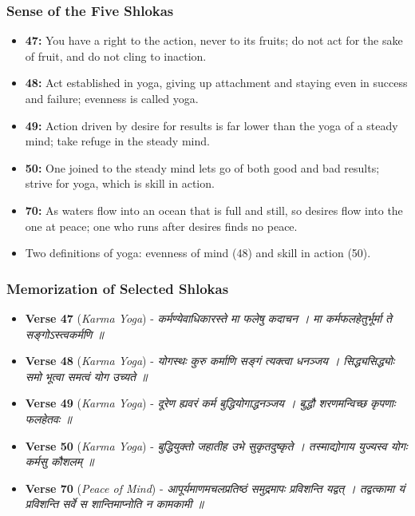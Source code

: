 \begin{frame}[fragile]\frametitle{Sense of the Five Shlokas}

      \begin{itemize}
		\item \textbf{47:} You have a right to the action, never to its fruits; do not act for the sake of fruit, and do not cling to inaction.
		\item \textbf{48:} Act established in yoga, giving up attachment and staying even in success and failure; evenness is called yoga.
		\item \textbf{49:} Action driven by desire for results is far lower than the yoga of a steady mind; take refuge in the steady mind.
		\item \textbf{50:} One joined to the steady mind lets go of both good and bad results; strive for yoga, which is skill in action.
		\item \textbf{70:} As waters flow into an ocean that is full and still, so desires flow into the one at peace; one who runs after desires finds no peace.
		\item Two definitions of yoga: evenness of mind (48) and skill in action (50).
	  \end{itemize}

\end{frame}

\begin{frame}[fragile]\frametitle{Memorization of Selected Shlokas}

      \begin{itemize}
		\item \textbf{Verse 47} (\textit{Karma Yoga}) - \textit{कर्मण्येवाधिकारस्ते मा फलेषु कदाचन । मा कर्मफलहेतुर्भूर्मा ते सङ्गोऽस्त्वकर्मणि ॥}
		\item \textbf{Verse 48} (\textit{Karma Yoga}) - \textit{योगस्थः कुरु कर्माणि सङ्गं त्यक्त्वा धनञ्जय । सिद्ध्यसिद्ध्योः समो भूत्वा समत्वं योग उच्यते ॥}
		\item \textbf{Verse 49} (\textit{Karma Yoga}) - \textit{दूरेण ह्यवरं कर्म बुद्धियोगाद्धनञ्जय । बुद्धौ शरणमन्विच्छ कृपणाः फलहेतवः ॥}
		\item \textbf{Verse 50} (\textit{Karma Yoga}) - \textit{बुद्धियुक्तो जहातीह उभे सुकृतदुष्कृते । तस्माद्योगाय युज्यस्व योगः कर्मसु कौशलम् ॥}
		\item \textbf{Verse 70} (\textit{Peace of Mind}) - \textit{आपूर्यमाणमचलप्रतिष्ठं समुद्रमापः प्रविशन्ति यद्वत् । तद्वत्कामा यं प्रविशन्ति सर्वे स शान्तिमाप्नोति न कामकामी ॥}
	  \end{itemize}

\end{frame}

